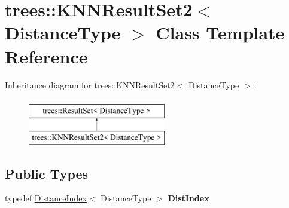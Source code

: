 \hypertarget{classtrees_1_1_k_n_n_result_set2}{}\section{trees\+:\+:K\+N\+N\+Result\+Set2$<$ Distance\+Type $>$ Class Template Reference}
\label{classtrees_1_1_k_n_n_result_set2}
Inheritance diagram for trees\+:\+:K\+N\+N\+Result\+Set2$<$ Distance\+Type $>$\+:\begin{figure}[H]
\begin{center}
\leavevmode
\includegraphics[height=2.000000cm]{classtrees_1_1_k_n_n_result_set2}
\end{center}
\end{figure}
\subsection*{Public Types}
\begin{DoxyCompactItemize}
\item 
\mbox{\label{classtrees_1_1_k_n_n_result_set2_a07912021a8df2c09a5a9aa12ae23a28f}} 
typedef \hyperlink{structtrees_1_1_distance_index}{Distance\+Index}$<$ Distance\+Type $>$ {\bfseries Dist\+Index}
\end{DoxyCompactItemize}
